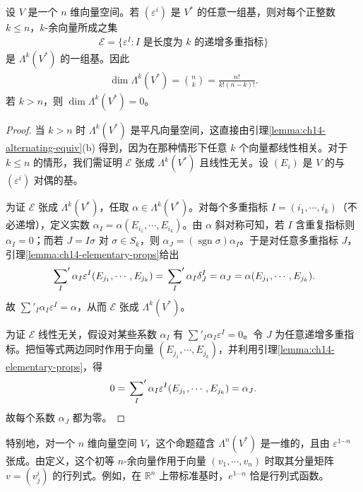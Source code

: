 \documentclass[../../main.tex]{subfiles}
\begin{document}
\begin{proposition}\label{proposition:ch14-alternating-basis}
设 $V$ 是一个 $n$ 维向量空间。若 $(\varepsilon^i)$ 是 $V^*$ 的任意一组基，则对每个正整数 $k\leqslant n$，$k$-余向量所成之集
\begin{align*}
\mathcal E=\{\varepsilon^I:I\text{ 是长度为 }k\text{ 的递增多重指标}\}
\end{align*}
是 $\Lambda^k(V^*)$ 的一组基。因此
\begin{align*}
\dim\Lambda^k(V^*)=\binom{n}{k}=\frac{n!}{k!(n-k)!}.
\end{align*}
若 $k>n$，则 $\dim\Lambda^k(V^*)=0$。
\end{proposition}

\begin{proof}
当 $k>n$ 时 $\Lambda^k(V^*)$ 是平凡向量空间，这直接由引理\ref{lemma:ch14-alternating-equiv}(b) 得到，因为在那种情形下任意 $k$ 个向量都线性相关。对于 $k\leqslant n$ 的情形，我们需证明 $\mathcal E$ 张成 $\Lambda^k(V^*)$ 且线性无关。设 $(E_i)$ 是 $V$ 的与 $(\varepsilon^i)$ 对偶的基。

为证 $\mathcal E$ 张成 $\Lambda^k(V^*)$，任取 $\alpha\in\Lambda^k(V^*)$。对每个多重指标 $I=(i_1,\cdots ,i_k)$（不必递增），定义实数 $\alpha_I=\alpha(E_{i_1},\cdots ,E_{i_k})$。由 $\alpha$ 斜对称可知，若 $I$ 含重复指标则 $\alpha_I=0$；而若 $J=I\sigma$ 对 $\sigma\in S_k$，则 $\alpha_J=(\operatorname{sgn}\sigma)\alpha_I$。于是对任意多重指标 $J$，引理\ref{lemma:ch14-elementary-props}给出
\begin{align*}
\sideset{}{'}\sum_I\alpha_I\varepsilon^I(E_{j_1},\cdots ,E_{j_k})
=\sideset{}{'}\sum_I\alpha_I\delta^I_J=\alpha_J=\alpha(E_{j_1},\cdots ,E_{j_k}).
\end{align*}
故 $\sum'_I\alpha_I\varepsilon^I=\alpha$，从而 $\mathcal E$ 张成 $\Lambda^k(V^*)$。

为证 $\mathcal E$ 线性无关，假设对某些系数 $\alpha_I$ 有 $\sum'_I\alpha_I\varepsilon^I=0$。令 $J$ 为任意递增多重指标。把恒等式两边同时作用于向量 $(E_{j_1},\cdots ,E_{j_k})$，并利用引理\ref{lemma:ch14-elementary-props}，得
\begin{align*}
0=\sideset{}{'}\sum_I\alpha_I\varepsilon^I(E_{j_1},\cdots ,E_{j_k})=\alpha_J.
\end{align*}
故每个系数 $\alpha_J$ 都为零。
\end{proof}

特别地，对一个 $n$ 维向量空间 $V$，这个命题蕴含 $\Lambda^n(V^*)$ 是一维的，且由 $\varepsilon^{1\cdots  n}$ 张成。由定义，这个初等 $n$-余向量作用于向量 $(v_1,\cdots ,v_n)$ 时取其分量矩阵 $v=(v^i_j)$ 的行列式。例如，在 $\mathbb{R}^n$ 上带标准基时，$e^{1\cdots  n}$ 恰是行列式函数。
\end{document}
